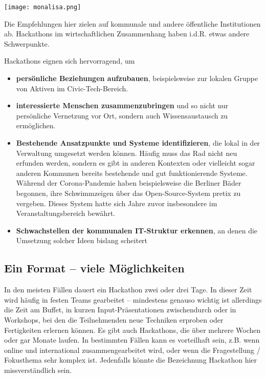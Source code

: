 \begin{marginfigure}[-5.5cm]
	\texttt{[image: monalisa.png]}
\end{marginfigure}

Die Empfehlungen hier zielen auf kommunale und andere öffentliche Institutionen ab. Hackathons im wirtschaftlichen Zusammenhang haben i.d.R. etwas andere Schwerpunkte.

Hackathons eignen sich hervorragend, um

\begin{itemize}
	\item \textbf{persönliche Beziehungen aufzubauen}, \newline beispielsweise zur lokalen Gruppe von Aktiven im Civic-Tech-Bereich. 
	\vspace{0.5cm}
	\item \textbf{interessierte Menschen zusammenzubringen} \newline und so nicht nur persönliche Vernetzung vor Ort, sondern auch Wissensaustausch zu ermöglichen.
	\vspace{0.5cm}
	\item \textbf{Bestehende Ansatzpunkte und Systeme identifizieren}, \newline die lokal in der Verwaltung umgesetzt werden können. Häufig muss das Rad nicht neu erfunden werden, sondern es gibt in anderen Kontexten oder vielleicht sogar anderen Kommunen bereits bestehende und gut funktionierende Systeme. Während der Corona-Pandemie haben beispielsweise die Berliner Bäder begonnen, ihre Schwimmzeigen über das Open-Source-System pretix zu vergeben. Dieses System hatte sich Jahre zuvor insbesondere im Veranstaltungsbereich bewährt.
	\vspace{0.5cm}
	\item \textbf{Schwachstellen der kommunalen IT-Struktur erkennen}, \newline an denen die Umsetzung solcher Ideen bislang scheitert
\end{itemize}


\subsection*{Ein Format – viele Möglichkeiten}

In den meisten Fällen dauert ein Hackathon zwei oder drei Tage. In dieser Zeit wird häufig in festen Teams gearbeitet – mindestens genauso wichtig ist allerdings die Zeit am Buffet, in kurzen Input-Präsentationen zwischendurch oder in Workshops, bei den die Teilnehmenden neue Techniken erproben oder Fertigkeiten erlernen können.
Es gibt auch Hackathons, die über mehrere Wochen oder gar Monate laufen. In bestimmten Fällen kann es vorteilhaft sein, z.B. wenn online und international zusammengearbeitet wird, oder wenn die Fragestellung / Fokusthema sehr komplex ist. Jedenfalls könnte die Bezeichnung Hackathon hier missverständlich sein.


